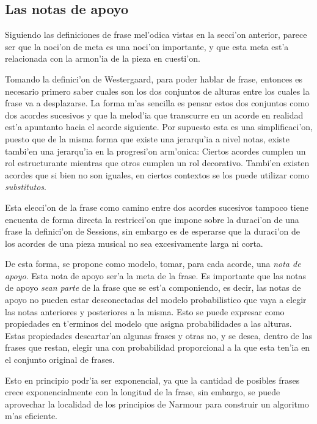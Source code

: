 \subsection{Las notas de apoyo}
Siguiendo las definiciones
de frase mel'odica vistas en la secci'on anterior, parece ser que la noci'on de meta es una noci'on importante, y que esta meta
est'a relacionada con la armon'ia de la pieza en cuesti'on. 

Tomando la definici'on de Westergaard, para poder hablar de frase, entonces es necesario primero saber cuales son los dos conjuntos de 
alturas entre los cuales la frase va a desplazarse. La forma m'as sencilla es pensar estos dos conjuntos como dos acordes sucesivos
y que la melod'ia que transcurre en un acorde en realidad est'a apuntanto hacia el acorde siguiente. Por supuesto
esta es una simplificaci'on, puesto que de la misma forma que existe una jerarqu'ia a nivel notas, existe tambi'en una jerarqu'ia
en la progresi'on arm'onica: Ciertos acordes cumplen un rol estructurante mientras que otros cumplen un rol decorativo. Tambi'en
existen acordes que si bien no son iguales, en ciertos contextos se los puede utilizar como \emph{substitutos}. 

Esta elecci'on de la frase como camino entre dos acordes sucesivos tampoco tiene encuenta de forma directa la restricci'on 
que impone sobre la duraci'on de una frase la definici'on de Sessions, sin embargo es de esperarse que la duraci'on de los acordes de una pieza musical
no sea excesivamente larga ni corta. 

De esta forma, se propone como modelo, tomar, para cada acorde, una \emph{nota de apoyo}. Esta nota de apoyo ser'a la meta de 
la frase. Es importante que las notas de apoyo \emph{sean parte} de la frase que se est'a componiendo, es decir, las notas
de apoyo no pueden estar desconectadas del modelo probabilistico que vaya a elegir las notas anteriores y posteriores a la misma. 
Esto se puede expresar como propiedades en t'erminos del modelo que asigna probabilidades a las alturas. 
Estas propiedades descartar'an algunas frases y otras no, y se desea, dentro de las frases que restan, elegir una con probabilidad
proporcional a la que esta ten'ia en el conjunto original de frases. 

Esto en principio podr'ia ser exponencial, ya que la cantidad de posibles frases crece exponencialmente con la longitud de la frase,
sin embargo, se puede aprovechar la localidad de los principios de Narmour para construir un algoritmo m'as eficiente.  

